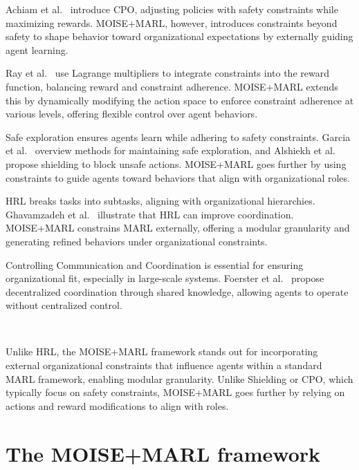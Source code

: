 \documentclass[sigconf,anonymous]{aamas}
\begin{document}
Achiam et al.~\cite{achiam2017cpo} introduce CPO, adjusting policies with safety constraints while maximizing rewards. MOISE+MARL, however, introduces constraints beyond safety to shape behavior toward organizational expectations by externally guiding agent learning.

Ray et al.~\cite{ray2019benchmarking} use Lagrange multipliers to integrate constraints into the reward function, balancing reward and constraint adherence. MOISE+MARL extends this by dynamically modifying the action space to enforce constraint adherence at various levels, offering flexible control over agent behaviors.

Safe exploration ensures agents learn while adhering to safety constraints. Garcia et al.~\cite{garcia2015comprehensive} overview methods for maintaining safe exploration, and Alshiekh et al.~\cite{alshiekh2018safe} propose shielding to block unsafe actions. MOISE+MARL goes further by using constraints to guide agents toward behaviors that align with organizational roles.

HRL breaks tasks into subtasks, aligning with organizational hierarchies. Ghavamzadeh et al.~\cite{ghavamzadeh2006hrl} illustrate that HRL can improve coordination. MOISE+MARL constrains MARL externally, offering a modular granularity and generating refined behaviors under organizational constraints.

Controlling Communication and Coordination is essential for ensuring organizational fit, especially in large-scale systems. Foerster et al.~\cite{foerster2018communication} propose decentralized coordination through shared knowledge, allowing agents to operate without centralized control.

\

\noindent Unlike HRL, the MOISE+MARL framework stands out for incorporating external organizational constraints that influence agents within a standard MARL framework, enabling modular granularity. Unlike Shielding or CPO, which typically focus on safety constraints, MOISE+MARL goes further by relying on actions and reward modifications to align with roles. %


\section{The MOISE+MARL framework}
\label{sec:moise_marl_framework}
\end{document}
